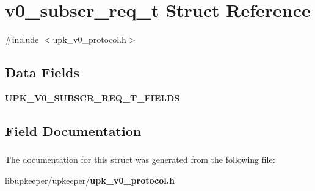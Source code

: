 \section{v0\_\-subscr\_\-req\_\-t Struct Reference}
\label{structv0__subscr__req__t}


{\ttfamily \#include $<$upk\_\-v0\_\-protocol.h$>$}

\subsection*{Data Fields}
\begin{DoxyCompactItemize}
\item 
{\bf UPK\_\-V0\_\-SUBSCR\_\-REQ\_\-T\_\-FIELDS}
\end{DoxyCompactItemize}


\subsection{Field Documentation}
\subsubsection[{UPK\_\-V0\_\-SUBSCR\_\-REQ\_\-T\_\-FIELDS}]{}\label{structv0__subscr__req__t_a4b03ae9a234c160e2b06d57e4cc5bdca}


The documentation for this struct was generated from the following file:\begin{DoxyCompactItemize}
\item 
libupkeeper/upkeeper/{\bf upk\_\-v0\_\-protocol.h}\end{DoxyCompactItemize}
